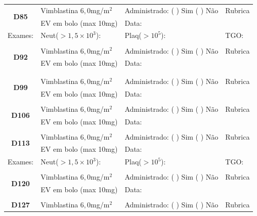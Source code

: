 \documentclass[11pt,a4paper,oldfontcommands]{memoir}
\begin{document}
\begin{center}
\begin{longtable}{p{1cm}p{5cm}|p{5cm}|p{3cm}}
    \\
    \hline
    \multicolumn{1}{c|}{\multirow{2}{*}{\textbf{D85}}}&{Vimblastina \(6,0\)mg/m\(^2\)}&{Administrado: (  ) Sim (  ) Não}&{Rubrica}\\
    \multicolumn{1}{c|}{}&{EV em bolo (max 10mg)}&{Data:}&\\
    \hline
    {\tiny{Exames:}}&{\tiny{Neut(\(>1,5\times10^3\)):}}&{\tiny{Plaq(\(>10^5\)):}}&{\tiny{TGO:}}
    \\
    \hline
    \\
    \hline
    \multicolumn{1}{c|}{\multirow{2}{*}{\textbf{D92}}}&{Vimblastina \(6,0\)mg/m\(^2\)}&{Administrado: (  ) Sim (  ) Não}&{Rubrica}\\
    \multicolumn{1}{c|}{}&{EV em bolo (max 10mg)}&{Data:}&\\
    \hline\\
    \\[0.6cm]
    \hline
    \multicolumn{1}{c|}{\multirow{2}{*}{\textbf{D99}}}&{Vimblastina \(6,0\)mg/m\(^2\)}&{Administrado: (  ) Sim (  ) Não}&{Rubrica}\\
    \multicolumn{1}{c|}{}&{EV em bolo (max 10mg)}&{Data:}&\\
    \hline
    \\
    \hline
    \multicolumn{1}{c|}{\multirow{2}{*}{\textbf{D106}}}&{Vimblastina \(6,0\)mg/m\(^2\)}&{Administrado: (  ) Sim (  ) Não}&{Rubrica}\\
    \multicolumn{1}{c|}{}&{EV em bolo (max 10mg)}&{Data:}&\\
    \hline
    \\
    \hline
    \multicolumn{1}{c|}{\multirow{2}{*}{\textbf{D113}}}&{Vimblastina \(6,0\)mg/m\(^2\)}&{Administrado: (  ) Sim (  ) Não}&{Rubrica}\\
    \multicolumn{1}{c|}{}&{EV em bolo (max 10mg)}&{Data:}&\\
    \hline
    {\tiny{Exames:}}&{\tiny{Neut(\(>1,5\times10^3\)):}}&{\tiny{Plaq(\(>10^5\)):}}&{\tiny{TGO:}}
    \\
    \hline
    \\
    \hline
    \multicolumn{1}{c|}{\multirow{2}{*}{\textbf{D120}}}&{Vimblastina \(6,0\)mg/m\(^2\)}&{Administrado: (  ) Sim (  ) Não}&{Rubrica}\\
    \multicolumn{1}{c|}{}&{EV em bolo (max 10mg)}&{Data:}&\\
    \hline\\
    \hline
    \multicolumn{1}{c|}{\multirow{2}{*}{\textbf{D127}}}&{Vimblastina \(6,0\)mg/m\(^2\)}&{Administrado: (  ) Sim (  ) Não}&{Rubrica}\\

\end{longtable}
\end{center}
\end{document}

